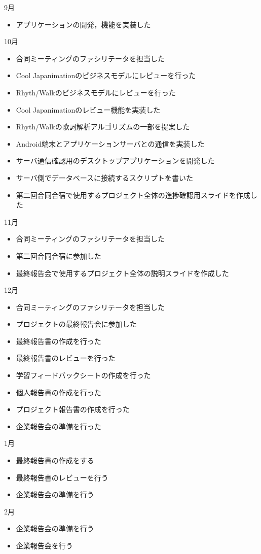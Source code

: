 \newpage
9月
\begin{itemize}
\item アプリケーションの開発，機能を実装した
\end{itemize}
10月
\begin{itemize}
\item 合同ミーティングのファシリテータを担当した
\item Cool Japanimationのビジネスモデルにレビューを行った
\item Rhyth/Walkのビジネスモデルにレビューを行った
\item Cool Japanimationのレビュー機能を実装した
\item Rhyth/Walkの歌詞解析アルゴリズムの一部を提案した
\item Android端末とアプリケーションサーバとの通信を実装した
\item サーバ通信確認用のデスクトップアプリケーションを開発した
\item サーバ側でデータベースに接続するスクリプトを書いた
\item 第二回合同合宿で使用するプロジェクト全体の進捗確認用スライドを作成した
\end{itemize}
11月
\begin{itemize}
\item 合同ミーティングのファシリテータを担当した
\item 第二回合同合宿に参加した
\item 最終報告会で使用するプロジェクト全体の説明スライドを作成した
\end{itemize}
12月
\begin{itemize}
\item 合同ミーティングのファシリテータを担当した
\item プロジェクトの最終報告会に参加した
\item 最終報告書の作成を行った
\item 最終報告書のレビューを行った
\item 学習フィードバックシートの作成を行った
\item 個人報告書の作成を行った
\item プロジェクト報告書の作成を行った
\item 企業報告会の準備を行った
\end{itemize}
1月
\begin{itemize}
\item 最終報告書の作成をする
\item 最終報告書のレビューを行う
\item 企業報告会の準備を行う
\end{itemize}
2月
\begin{itemize}
\item 企業報告会の準備を行う
\item 企業報告会を行う
\end{itemize}

